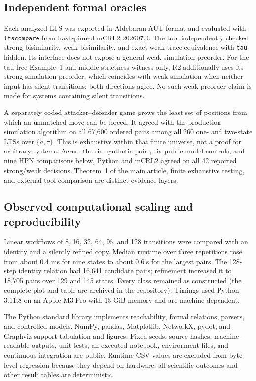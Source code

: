 \documentclass{ws-jbcb}
\numberwithin{equation}{section}
\newcommand{\TAU}{\tau}
\begin{document}
\subsection{Independent formal oracles}\label{sec:mcrl2-method}

Each analyzed LTS was exported in Aldebaran AUT format and evaluated with
\texttt{ltscompare} from hash-pinned mCRL2 202607.0.\cite{Bunte2019} The tool
independently checked strong bisimilarity, weak bisimilarity, and exact weak-trace
equivalence with \texttt{tau} hidden. Its interface does not expose a general weak-simulation preorder. For
the tau-free Example~1 and middle strictness witness only, R2 additionally
uses its strong-simulation preorder, which coincides with weak simulation
when neither input has silent transitions; both directions agree. No such
weak-preorder claim is made for systems containing silent transitions.

A separately coded attacker--defender game grows the least set of positions from
which an unmatched move can be forced. It agreed with the production simulation
algorithm on all 67,600 ordered pairs among all 260 one- and two-state LTSs over
$\{a,\TAU\}$. This is exhaustive within that finite universe, not a proof for
arbitrary systems. Across the six synthetic pairs, six public-model controls,
and nine HPN comparisons below, Python and mCRL2 agreed on all 42 reported
strong/weak decisions. Theorem~1 of the main article, finite exhaustive testing,
and external-tool comparison are distinct evidence layers.

\subsection{Observed computational scaling and reproducibility}
\label{sec:scalability-method}

Linear workflows of 8, 16, 32, 64, 96, and 128 transitions were compared with an
identity and a silently refined copy. Median runtime over three repetitions rose
from about 0.4 ms for nine states to about 0.6 s for the largest pairs. The
128-step identity relation had 16,641 candidate pairs; refinement increased it
to 18,705 pairs over 129 and 145 states. Every class remained as constructed
(the complete plot and table are archived in the repository). Timings used
Python 3.11.8 on an Apple M3 Pro with 18 GiB memory and are machine-dependent.

The Python standard library implements reachability, formal relations, parsers,
and controlled models. NumPy, pandas, Matplotlib, NetworkX, pydot, and Graphviz
support tabulation and figures. Fixed seeds, source hashes,
machine-readable outputs, unit tests, an executed notebook, environment files,
and continuous integration are public. Runtime CSV values are excluded from
byte-level regression because they depend on hardware; all scientific outcomes
and other result tables are deterministic.
\end{document}
